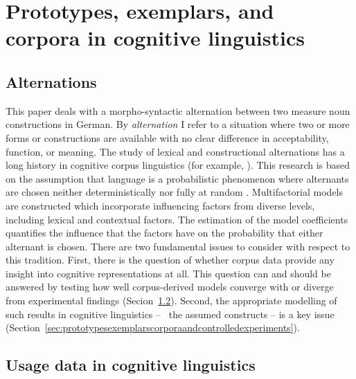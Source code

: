 \section{Prototypes, exemplars, and corpora in cognitive linguistics}
\label{sec:cogocl}

\subsection{Alternations}
\label{sec:alternations}

This paper deals with a morpho-syntactic alternation between two measure noun constructions in German.
By \textit{alternation} I refer to a situation where two or more forms or constructions are available with no clear difference in acceptability, function, or meaning.
The study of lexical and constructional alternations has a long history in cognitive corpus linguistics (for example, \citealp{BresnanEa2007,BresnanHay2010,BresnanFord2010,DivjakArppe2013,Gries2015,NessetJanda2010}).
This research is based on the assumption that language is a probabilistic phenomenon where alternants are chosen neither deterministically nor fully at random \citep{Bresnan2007}.
Multifactorial models are constructed which incorporate influencing factors from diverse levels, including lexical and contextual factors.
The estimation of the model coefficients quantifies the influence that the factors have on the probability that either alternant is chosen.
There are two fundamental issues to consider with respect to this tradition.
First, there is the question of whether corpus data provide any insight into cognitive representations at all.
This question can and should be answered by testing how well corpus-derived models converge with or diverge from experimental findings (Secion~\ref{sec:usagedataincognitivelinguistics}).
Second, the appropriate modelling of such results in cognitive linguistics -- \ie\ the assumed constructs -- is a key issue (Section~\ref{sec:prototypesexemplarscorporaandcontrolledexperiments}).

\subsection{Usage data in cognitive linguistics}
\label{sec:usagedataincognitivelinguistics}

